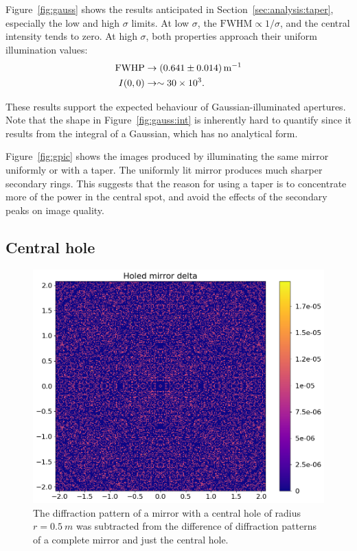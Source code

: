 \documentclass{article}
\newcommand{\R}[1]{\mathrm{#1}}
\begin{document}
Figure~\ref{fig:gauss} shows the results anticipated in Section~\ref{sec:analysis:taper}, especially the low and high $\sigma$ limits. At low $\sigma$, the $\R{FWHM} \propto 1/\sigma$, and the central intensity tends to zero. At high $\sigma$, both properties approach their uniform illumination values:
\begin{align*}
    \R{FWHP} &\rightarrow \SI{0.641 \pm 0.014}{\per\metre} \\
    I(0, 0) &\rightarrow \sim \num{30e3}.
\end{align*}

These results support the expected behaviour of Gaussian-illuminated apertures. Note that the shape in Figure~\ref{fig:gauss:int} is inherently hard to quantify since it results from the integral of a Gaussian, which has no analytical form.

Figure~\ref{fig:gpic} shows the images produced by illuminating the same mirror uniformly or with a taper. The uniformly lit mirror produces much sharper secondary rings. This suggests that the reason for using a taper is to concentrate more of the power in the central spot, and avoid the effects of the secondary peaks on image quality.

\subsection{Central hole}\label{sec:res:hole}
\begin{figure}
    \centering
    \begin{minipage}{0.6\textwidth}
        \centering
        \includegraphics[width=\textwidth]{pictures/hole/delta2.png}
    \end{minipage}%
    \hfill
    \begin{minipage}{0.37\textwidth}
        \caption{The diffraction pattern of a mirror with a central hole of radius $r=\SI{0.5}{m}$ was subtracted from the difference of diffraction patterns of a complete mirror and just the central hole.}\label{fig:hole}
    \end{minipage}
\end{figure}
\end{document}
